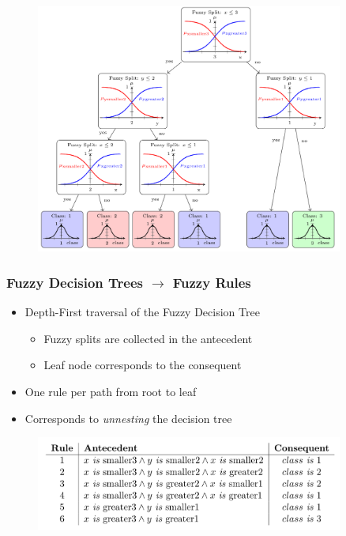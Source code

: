 \documentclass[
	10pt,
	t		%
]{beamer}
\begin{document}
\begin{frame}

	\begin{figure}
		\centering
		\includegraphics[width=0.9\textwidth]{figures/fuzzy-decision-tree.png}
	\end{figure}
	
\end{frame}

\begin{frame}

	\frametitle{Fuzzy Decision Trees $\rightarrow$ Fuzzy Rules}
	
	\begin{itemize}
		\item Depth-First traversal of the Fuzzy Decision Tree
		      \begin{itemize}
			      \item Fuzzy splits are collected in the antecedent
			      \item Leaf node corresponds to the consequent
		      \end{itemize}
		\item One rule per path from root to leaf
		\item Corresponds to \textit{unnesting} the decision tree
	\end{itemize}
	
	\begin{figure}
		\centering
		\includegraphics[width=0.9\textwidth]{figures/extracted-rules.png}
	\end{figure}
	
\end{frame}
\end{document}
